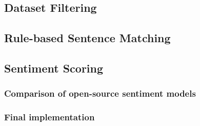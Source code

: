 \documentclass{report}
\begin{document}
\subsection{Dataset Filtering}




\subsection{Rule-based Sentence Matching}



\subsection{Sentiment Scoring}


\subsubsection{Comparison of open-source sentiment models}




\subsubsection{Final implementation}

\end{document}
